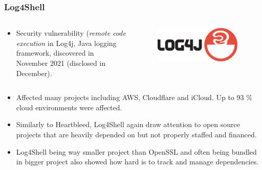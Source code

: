 \documentclass[aspectratio=169]{beamer}              %
\begin{document}
\begin{frame}
	\frametitle{Log4Shell}
	
\begin{columns}
\begin{column}{0.68\textwidth}

		\begin{itemize}
			\item Security vulnerability (\emph{remote code execution} in Log4j, Java logging framework, discovered in November 2021 (disclosed in December). \footnotemark~\footnotemark
		\end{itemize}
\end{column}

\begin{column}{0.25\textwidth}
	\begin{figure}[ht!]
	\begin{center}
  	  \includegraphics[width=0.95\textwidth]{img/log4j.png}
	\end{center}
	\end{figure}
\end{column}
\end{columns}

		\begin{itemize}
			\item Affected many projects including AWS, Cloudflare and iCloud. Up to 93 \% cloud environments were affected.
			\item Similarly to Heartbleed, Log4Shell again draw attention to open source projects that are heavily depended on but not properly staffed and financed.\footnotemark
			\item Log4Shell being way smaller project than OpenSSL and often being bundled in bigger project also showed how hard is to track and manage dependencies.
		\end{itemize}


\end{frame}
\end{document}
